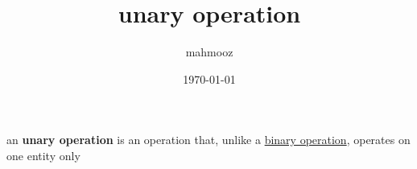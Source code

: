 \documentclass[11pt]{article}
\author{mahmooz}
\date{\today}
\title{unary operation}
\begin{document}
\maketitle
\tableofcontents

\begin{definition}
an \textbf{unary operation} is an operation that, unlike a \href{20221219005229-binary_operation.org}{binary operation}, operates on one entity only\\[0pt]
\end{definition}
\end{document}
